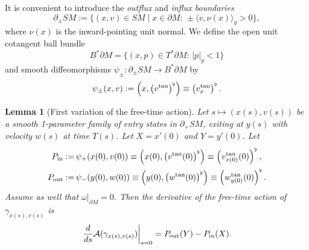 \documentclass[12pt]{amsart}
\numberwithin{equation}{section}
\newtheorem{lemma}[theorem]{Lemma}
\begin{document}
It is convenient to introduce the \emph{outflux} and \emph{influx boundaries}
\begin{equation}\label{eq4.14}
\partial_{\pm} SM := \{ (x, v) \in SM \mid x \in \partial M:\, \pm\langle v, \nu(x) \rangle_g > 0\},
\end{equation}
where $\nu(x)$ is the inward-pointing unit normal. We define the open unit cotangent ball bundle
\begin{equation}\label{eq4.15}
B^*\partial M = \{ (x, p) \in T^*\partial M:\, |p|_g < 1 \}
\end{equation}
and smooth diffeomorphisms $\psi_\pm : \partial_\pm SM \to B^*\partial M$ by
\begin{equation}
\label{eq4.16}
\psi_\pm(x, v):= \left (x, \left ( v^{\rm tan}\right )^\flat\right ) \equiv \left ( v_x^{\rm tan}\right )^\flat.
\end{equation}

\begin{lemma}[First variation of the free-time action] \label{lem:variation}
Let $s \mapsto (x(s), v(s))$ be a smooth 1-parameter family of entry states in $\partial_+ SM$, exiting at $y(s)$ with velocity $w(s)$ at time $T(s)$. Let $X = x'(0)$ and $Y = y'(0)$. Let
\begin{equation}
\label{eq4,17}
\begin{split}
P_{\rm in} :=&\, \psi_+(x(0),v(0))\equiv \left ( x(0),\left ( v^{\rm tan}(0)\right )^{\flat}\right ) \equiv \left ( v_{x(0)}^{\rm tan}(0)\right )^{\flat},\\
P_{\rm out} :=&\, \psi_-(y(0), w(0))\equiv \left ( y(0),\left ( w^{\rm tan}(0)\right )^{\flat}\right ) \equiv \left ( w_{y(0)}^{\rm tan}(0)\right )^{\flat}.
\end{split}
\end{equation}
Assume as well that $\omega\vert_{\partial M}=0$. Then the derivative of the free-time action of $\gamma_{x(s),v(s)}$ is
\begin{equation}
    \left. \frac{d}{ds} {\mathcal A}(\gamma_{x(s),v(s)}) \right|_{s=0} = P_{\rm out}(Y) - P_{\rm in}(X) .
\end{equation}
\end{lemma}
\end{document}
